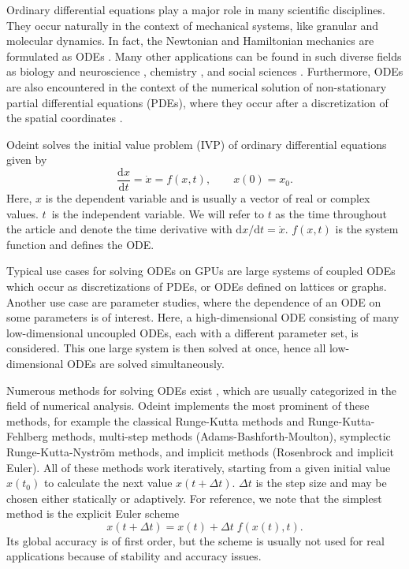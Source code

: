 \documentclass[final]{siamltex}
\newcommand {\de} {\mbox{d}}
\begin{document}
Ordinary differential equations play a major role in many scientific
disciplines. They occur naturally in the context of mechanical systems, like
granular \cite{poschel_computational_2005} and molecular dynamics. In fact, the
Newtonian and Hamiltonian mechanics are formulated as ODEs
\cite{landau_mechanics_1976}.  Many other applications can be found in such
diverse fields as biology \cite{brauer_mathematical_2001,Murray-93} and
neuroscience \cite{izhikevich_dynamical_2006}, chemistry
\cite{atkins_physical_2001}, and social sciences \cite{Helbing01}. Furthermore,
ODEs are also encountered in the context of the numerical solution of
non-stationary partial differential equations (PDEs), where they occur after
a discretization of the spatial coordinates \cite{Hundsdorfer2003}.

Odeint solves the initial value problem (IVP) of ordinary differential
equations given by
\begin{equation}
\frac{\de x}{\de t } = \dot{x} = f(x , t), \quad \quad x(0) = x_0.
\label{eq:ode}
\end{equation}
Here, $x$ is the dependent variable and is usually a vector of real or complex
values.  $t$~is the independent variable. We will refer to $t$ as the time
throughout the article and denote the time derivative with $\de x / \de t =
\dot{x}$. $f(x,t)$ is the system function and defines the ODE.

Typical use cases for solving ODEs on GPUs are large systems of coupled ODEs
which occur as discretizations of PDEs, or ODEs defined on lattices or
graphs. Another use case are parameter studies, where the
dependence of an ODE on some parameters is of interest. Here, a high-dimensional ODE consisting of many low-dimensional
uncoupled ODEs, each with a different parameter set, is
considered. This one large system is then solved at once, hence all
low-dimensional ODEs are solved simultaneously.



Numerous methods for solving ODEs exist \cite{HairerSolvingODEI,
HairerSolvingODEII,Press-92}, which are usually categorized in the field of numerical
analysis.  Odeint implements the most prominent of these methods, for example
the classical Runge-Kutta methods and Runge-Kutta-Fehlberg methods, multi-step
methods (Adams-Bashforth-Moulton), symplectic Runge-Kutta-Nystr\"om methods,
and implicit methods (Rosenbrock and implicit Euler). All of these methods work
iteratively, starting from a given initial value $x(t_0)$ to calculate the next
value $x(t+\Delta t)$.  $\Delta t$ is the step size and may be chosen either
statically or adaptively.  For reference, we note that the simplest method is
the explicit Euler scheme
\begin{equation}
x\left(t+\Delta t\right) = x(t) + \Delta t \; f(x(t),t) .
\label{eq:euler}
\end{equation}
Its global accuracy is of first order, but the scheme is usually not
used for real applications because of stability and accuracy issues.
\end{document}
